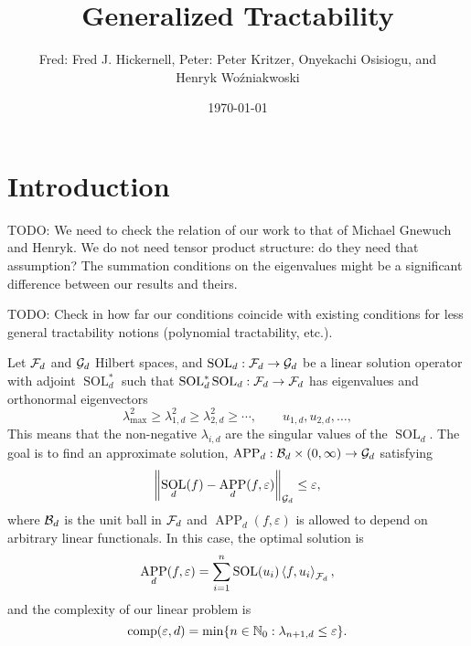 \documentclass[11pt,a4paper]{article}
\DeclareMathOperator{\SOL}{SOL}
\DeclareMathOperator{\APP}{APP}
\newcommand{\fred}[1]{\begingroup\color{blue}Fred: #1\endgroup}
\newcommand{\peter}[1]{\begingroup\color{purple}Peter: #1\endgroup}
\newcommand{\kachi}[1]{\begingroup\color{ForestGreen}#1\endgroup}
\begin{document}
\newtheorem{theorem}{Theorem}
\theoremstyle{definition}
\newtheorem{definition}{Definition}


\title{Generalized Tractability}
\author{\fred{Fred J. Hickernell}, \peter{Peter Kritzer}, \kachi{Onyekachi Osisiogu}, and \\ Henryk Wo\'zniakwoski}
\date{\today}

\maketitle

\section{Introduction}

TODO: We need to check the relation of our work to that of Michael Gnewuch and Henryk. We do not need tensor product structure: do they need that assumption? The summation conditions on the eigenvalues might be a significant difference between our results and theirs.

\medskip

TODO: Check in how far our conditions coincide with existing conditions for less general tractability notions (polynomial tractability, etc.).

\medskip

Let $\mathcal{F}_d$ and $\mathcal{G}_d$ Hilbert spaces, and $\SOL_d : \cf_d \to \cg_d$ be a linear solution operator with adjoint $\SOL_d^*$ such that $\SOL_d^*\SOL_d : \cf_d \to \cf_d$ has eigenvalues and orthonormal eigenvectors  
\[
\lambda_{\max}^2 \ge \lambda_{1,d}^2 \ge \lambda_{2,d}^2 \ge \cdots, \qquad u_{1,d}, u_{2,d}, \ldots, 
\]
This means that the non-negative $\lambda_{i,d}$ are the singular values of the $\SOL_d$. The goal is to find an approximate solution, $\APP_d:\cb_d \times (0,\infty) \to \cg_d$ satisfying 
\[
\norm[\cg_d]{\SOL_d(f) - \APP_d(f,\varepsilon)} \le \varepsilon,
\]
where $\mathcal{B}_d$ is the unit ball in $\mathcal{F}_d$ and $\APP_d(f,\varepsilon)$ is allowed to depend on arbitrary linear functionals.  In this case, the optimal solution is 
\[
\APP_d(f,\varepsilon) = \sum_{i=1}^n \SOL(u_i) \ip[\cf_d]{f}{u_i},
\]
and the complexity of our linear problem is
\[
\operatorname{comp}(\varepsilon, d) = \min \{n \in \mathbb{N}_{0} : \lambda_{n+1, d} \le \varepsilon\}.
\]
\end{document}

